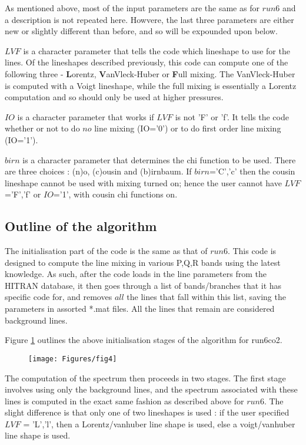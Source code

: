 \documentclass[11pt]{article}
\begin{document}
As mentioned above, most of the input parameters are the same as for $run6$
and a description is not repeated here. Howvere, the last three parameters
are either new or slightly different than before, and so will be expounded
upon below.

$LVF$ is a character parameter that tells the code which lineshape to use 
for the lines. Of the lineshapes described previously, this code can 
compute one of the following three - \textbf{L}orentz, 
\textbf{V}anVleck-Huber or 
\textbf{F}ull mixing. The VanVleck-Huber is computed with a Voigt 
lineshape, while the full mixing is essentially a Lorentz computation and so
should only be used at higher pressures.

$IO$ is a character parameter that works if $LVF$ is not 'F' or 'f'. It 
tells the code whether or not to do $no$ line mixing (IO='0') or to do 
first order line mixing (IO='1').

$birn$ is a character parameter that determines the chi function to be used.
There are three choices : (n)o, (c)ousin and (b)irnbaum. If $birn$='C','c'
then the cousin lineshape cannot be used with mixing turned on; hence the 
user cannot have $LVF$='F','f' or $IO$='1', with cousin chi functions on.

\subsection{Outline of the algorithm}
The initialisation part of the code is the same as that of $run6$. This code
is designed to compute the line mixing in various P,Q,R bands using the 
latest
knowledge. As such, after the code loads in the line parameters from the 
HITRAN database, it then goes through a list of bands/branches that it has
specific code for, and removes $all$ the lines that fall within this list,
saving the parameters in assorted *.mat files. All the lines that remain are
considered background lines.

Figure \ref{fig:init_algCO2} outlines the above initialisation stages of 
the algorithm for run6co2.

\begin{figure}
  \begin{center}\texttt{[image: Figures/fig4]}\end{center}
  \caption[Outline of initialization algorithm for CO2]{}
  \label{fig:init_algCO2}
\end{figure}

The computation of the spectrum then proceeds in two stages. The first 
stage 
involves using only the background lines, and the spectrum associated with 
these lines is computed in the exact same fashion as described above for 
$run6$. The slight difference is that only one of two lineshapes is used :
if the user specified $LVF$ = 'L','l', then a Lorentz/vanhuber line shape 
is used, else a voigt/vanhuber line shape is used.
\end{document}
